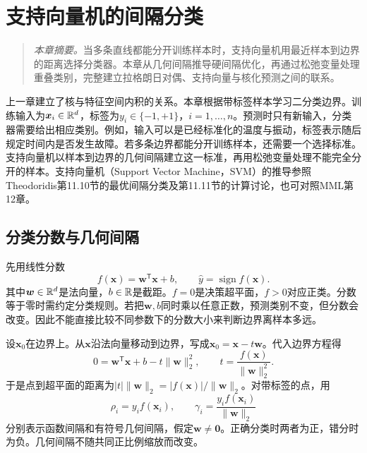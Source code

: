 \chapter{支持向量机的间隔分类}
\label{chap:svm}
\label{chap:kernel-algorithms}
\begin{quote}\small
\textit{本章摘要。}当多条直线都能分开训练样本时，支持向量机用最近样本到边界的距离选择分类器。本章从几何间隔推导硬间隔优化，再通过松弛变量处理重叠类别，完整建立拉格朗日对偶、支持向量与核化预测之间的联系。
\end{quote}

上一章建立了核与特征空间内积的关系。本章根据带标签样本学习二分类边界。训练输入为$\bm x_i\in\mathbb{R}^d$，标签为$y_i\in\{-1,+1\}$，$i=1,\ldots,n$。预测时只有新输入，分类器需要给出相应类别。例如，输入可以是已经标准化的温度与振动，标签表示随后规定时间内是否发生故障。若多条边界都能分开训练样本，还需要一个选择标准。支持向量机以样本到边界的几何间隔建立这一标准，再用松弛变量处理不能完全分开的样本。支持向量机（Support Vector Machine，SVM）的推导参照Theodoridis第11.10节的最优间隔分类及第11.11节的计算讨论\cite{theodoridis2015ml}，也可对照MML第12章\cite{deisenroth2020mml}。

\section{分类分数与几何间隔}
先用线性分数
\begin{equation}
 f(\bm x)=\bm w^{\mathsf T}\bm x+b,\qquad
 \hat y=\operatorname{sign} f(\bm x).
\end{equation}
其中$\bm w\in\mathbb{R}^d$是法向量，$b\in\mathbb{R}$是截距。$f=0$是决策超平面，$f>0$对应正类。分数等于零时需约定分类规则。若把$\bm w,b$同时乘以任意正数，预测类别不变，但分数会改变。因此不能直接比较不同参数下的分数大小来判断边界离样本多远。

设$\bm x_0$在边界上。从$\bm x$沿法向量移动到边界，写成$\bm x_0=\bm x-t\bm w$。代入边界方程得
\begin{equation}
 0=\bm w^{\mathsf T}\bm x+b-t\|\bm w\|_2^2,
 \qquad t=\frac{f(\bm x)}{\|\bm w\|_2^2}.
\end{equation}
于是点到超平面的距离为$|t|\|\bm w\|_2=|f(\bm x)|/\|\bm w\|_2$。对带标签的点，用
\begin{equation}
 \rho_i=y_if(\bm x_i),\qquad
 \gamma_i=\frac{y_if(\bm x_i)}{\|\bm w\|_2}
 \label{eq:svm-geometric-margin}
\end{equation}
分别表示函数间隔和有符号几何间隔，假定$\bm w\ne\bm0$。正确分类时两者为正，错分时为负。几何间隔不随共同正比例缩放而改变。

